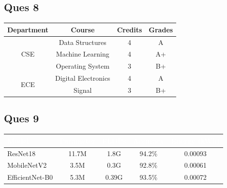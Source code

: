 \documentclass{article}
\begin{document}
\subsection{\textbf{Ques 8}}
\begin{table}[h]
\centering
\begin{tabular}{|c|c|c|c|}
\hline
\textbf{Department} & \textbf{Course} 
& \textbf{Credits} & \textbf{Grades} \\
\hline
\multirow{3}{*}{CSE} &
Data Structures & 4 & A \\
& Machine Learning & 4 & A+ \\
& Operating System & 3 & B+ \\
\hline
\multirow{2}{*}{ECE} &
Digital Electronics & 4 & A \\
& Signal & 3 & B+ \\
\hline
\end{tabular}
\end{table}

\newpage
\subsection{\textbf{Ques 9}}
\begin{table}[h]
\centering
\begin{tabular}{|l|c|c|c|c|}
\hline
\rowcolor{blue!60}
\textcolor{white}{\textbf{Model}} & \textcolor{white}{\textbf{Parameter}}
&
\textcolor{white}{\textbf{FLOPs}} &
\textcolor{white}{\textbf{Accuracy}} &
\textcolor{white}{\textbf{Energy (kWh)}} \\
\hline
\rowcolor{blue!10}
ResNet18 & 11.7M & 1.8G & 94.2\% & 0.00093 \\
\hline
MobileNetV2 & 3.5M & 0.3G & 92.8\% & 0.00061 \\
\hline
\rowcolor{blue!10}
EfficientNet-B0 & 5.3M & 0.39G & 93.5\% & 0.00072\\
\hline
\end{tabular}
\end{table}
\end{document}
